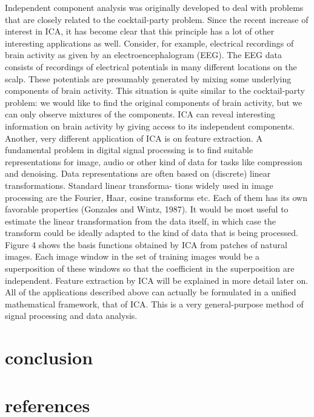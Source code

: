 \documentclass[12pt, a4paper, onecolumn]{IEEEtran}
\begin{document}
Independent component analysis was originally developed to deal with problems that are closely related to the cocktail-party problem. Since the recent increase of interest in ICA, it has become clear that this principle has a lot of other interesting applications as well.
Consider, for example, electrical recordings of brain activity as given by an electroencephalogram (EEG). The EEG data consists of recordings of electrical potentials in many different locations on the scalp. These potentials are presumably generated by mixing some underlying components of brain activity. This situation is quite similar to the cocktail-party problem: we would like to find the original components of brain activity, but we can only observe mixtures of the components. ICA can reveal interesting information on brain activity by giving access to its independent components.
Another, very different application of ICA is on feature extraction. A fundamental problem in digital signal processing is to find suitable representations for image, audio or other kind of data for tasks like compression and denoising. Data representations are often based on (discrete) linear transformations. Standard linear transforma- tions widely used in image processing are the Fourier, Haar, cosine transforms etc. Each of them has its own favorable properties (Gonzales and Wintz, 1987).
It would be most useful to estimate the linear transformation from the data itself, in which case the transform could be ideally adapted to the kind of data that is being processed. Figure 4 shows the basis functions obtained by ICA from patches of natural images. Each image window in the set of training images would be a superposition of these windows so that the coefficient in the superposition are independent. Feature extraction by ICA will be explained in more detail later on.
All of the applications described above can actually be formulated in a unified mathematical framework, that of ICA. This is a very general-purpose method of signal processing and data analysis.
\section{conclusion}
\section{references}
\end{document}
